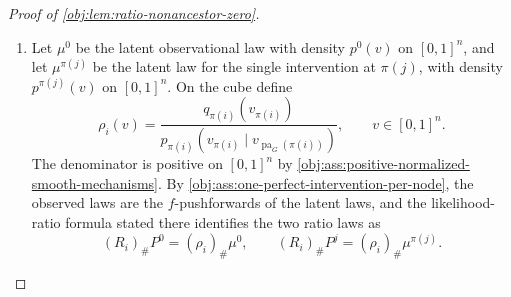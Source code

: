 \begin{proof}[Proof of \cref{obj:lem:ratio-nonancestor-zero}]
\begin{enumerate}
\item Let \(\mu^0\) be the latent observational law with density \(p^0(v)\) on \([0,1]^n\), and let \(\mu^{\pi(j)}\) be the latent law for the single intervention at \(\pi(j)\), with density \(p^{\pi(j)}(v)\) on \([0,1]^n\).  On the cube define
\[
\rho_i(v)
=
\frac{q_{\pi(i)}(v_{\pi(i)})}
{p_{\pi(i)}(v_{\pi(i)}\mid v_{\operatorname{pa}_G(\pi(i))})},
\qquad v\in[0,1]^n .
\]
The denominator is positive on \([0,1]^n\) by \cref{obj:ass:positive-normalized-smooth-mechanisms}.  By \cref{obj:ass:one-perfect-intervention-per-node}, the observed laws are the \(f\)-pushforwards of the latent laws, and the likelihood-ratio formula stated there identifies the two ratio laws as
\[
(R_i)_\#P^0=(\rho_i)_\#\mu^0,
\qquad
(R_i)_\#P^j=(\rho_i)_\#\mu^{\pi(j)} .
\]


\end{enumerate}
\end{proof}
